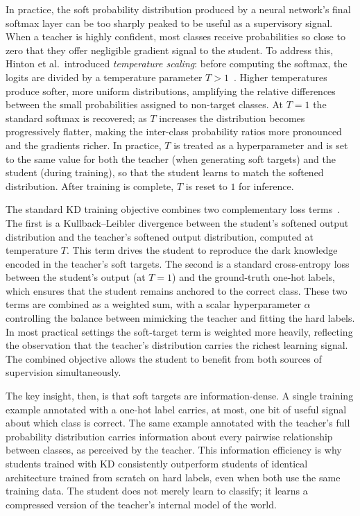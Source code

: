 \begin{foldable}
  In practice, the soft probability distribution produced by a neural network's final softmax layer can be too sharply peaked to be useful as a supervisory signal.
  When a teacher is highly confident, most classes receive probabilities so close to zero that they offer negligible gradient signal to the student.
  To address this, Hinton et al.\ introduced \emph{temperature scaling}: before computing the softmax, the logits are divided by a temperature parameter $T > 1$~\cite{hinton2015distilling}.
  Higher temperatures produce softer, more uniform distributions, amplifying the relative differences between the small probabilities assigned to non-target classes.
  At $T = 1$ the standard softmax is recovered; as $T$ increases the distribution becomes progressively flatter, making the inter-class probability ratios more pronounced and the gradients richer.
  In practice, $T$ is treated as a hyperparameter and is set to the same value for both the teacher (when generating soft targets) and the student (during training), so that the student learns to match the softened distribution.
  After training is complete, $T$ is reset to $1$ for inference.
\end{foldable}

\begin{foldable}
  The standard \ac{KD} training objective combines two complementary loss terms~\cite{hinton2015distilling}.
  The first is a Kullback--Leibler divergence between the student's softened output distribution and the teacher's softened output distribution, computed at temperature $T$.
  This term drives the student to reproduce the dark knowledge encoded in the teacher's soft targets.
  The second is a standard cross-entropy loss between the student's output (at $T = 1$) and the ground-truth one-hot labels, which ensures that the student remains anchored to the correct class.
  These two terms are combined as a weighted sum, with a scalar hyperparameter $\alpha$ controlling the balance between mimicking the teacher and fitting the hard labels.
  In most practical settings the soft-target term is weighted more heavily, reflecting the observation that the teacher's distribution carries the richest learning signal.
  The combined objective allows the student to benefit from both sources of supervision simultaneously.
\end{foldable}

\begin{foldable}
  The key insight, then, is that soft targets are information-dense.
  A single training example annotated with a one-hot label carries, at most, one bit of useful signal about which class is correct.
  The same example annotated with the teacher's full probability distribution carries information about every pairwise relationship between classes, as perceived by the teacher.
  This information efficiency is why students trained with \ac{KD} consistently outperform students of identical architecture trained from scratch on hard labels, even when both use the same training data.
  The student does not merely learn to classify; it learns a compressed version of the teacher's internal model of the world.
\end{foldable}

